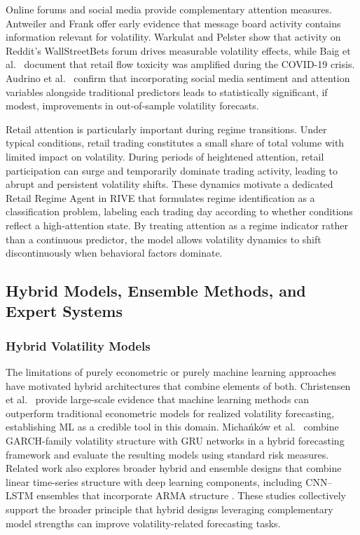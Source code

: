 \documentclass[review]{elsarticle}
\begin{document}
Online forums and social media provide complementary attention measures. Antweiler and Frank \cite{antweiler2004} offer early evidence that message board activity contains information relevant for volatility. Warkulat and Pelster \cite{warkulat2024} show that activity on Reddit's WallStreetBets forum drives measurable volatility effects, while Baig et al.~\cite{baig2023} document that retail flow toxicity was amplified during the COVID-19 crisis. Audrino et al.~\cite{audrino2020} confirm that incorporating social media sentiment and attention variables alongside traditional predictors leads to statistically significant, if modest, improvements in out-of-sample volatility forecasts.

Retail attention is particularly important during regime transitions. Under typical conditions, retail trading constitutes a small share of total volume with limited impact on volatility. During periods of heightened attention, retail participation can surge and temporarily dominate trading activity, leading to abrupt and persistent volatility shifts. These dynamics motivate a dedicated Retail Regime Agent in RIVE that formulates regime identification as a classification problem, labeling each trading day according to whether conditions reflect a high-attention state. By treating attention as a regime indicator rather than a continuous predictor, the model allows volatility dynamics to shift discontinuously when behavioral factors dominate.

\subsection{Hybrid Models, Ensemble Methods, and Expert Systems}\label{ensemble-expert-systems}

\subsubsection{Hybrid Volatility Models}\label{hybrid-models}

The limitations of purely econometric or purely machine learning approaches have motivated hybrid architectures that combine elements of both. Christensen et al.~\cite{christensen2023} provide large-scale evidence that machine learning methods can outperform traditional econometric models for realized volatility forecasting, establishing ML as a credible tool in this domain. Micha\'{n}k\'{o}w et al.~\cite{michankow2023} combine GARCH-family volatility structure with GRU networks in a hybrid forecasting framework and evaluate the resulting models using standard risk measures. Related work also explores broader hybrid and ensemble designs that combine linear time-series structure with deep learning components, including CNN--LSTM ensembles that incorporate ARMA structure \cite{he2023}. These studies collectively support the broader principle that hybrid designs leveraging complementary model strengths can improve volatility-related forecasting tasks.
\end{document}
